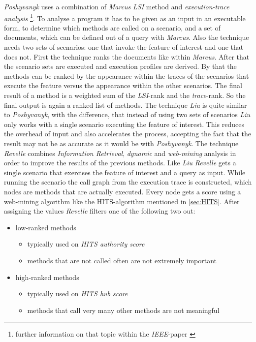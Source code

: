 \textit{Poshyvanyk} uses a combination of \textit{Marcus} \textit{LSI} method and \textit{execution-trace analysis} \footnote{further information on that topic within the \textit{IEEE}-paper \cite{antoniol2006feature}}. To analyse a program it has to be given as an input in an executable form, to determine which methods are called on a scenario, and a set of documents, which can be defined out of a query with \textit{Marcus}. Also the technique needs two sets of scenarios: one that invoke the feature of interest and one that does not. First the technique ranks the documents like within \textit{Marcus}. After that the scenario sets are executed and execution profiles are derived. By that the methods can be ranked by the appearance within the traces of the scenarios that execute the feature versus the appearance within the other scenarios. The final result of a method is a weighted sum of the \textit{LSI}-rank and the \textit{trace}-rank. So the final output is again a ranked list of methods. \cite{poshyvanyk2007feature} \newline
The technique \textit{Liu} is quite similar to \textit{Poshyvanyk}, with the difference, that instead of using two sets of scenarios \textit{Liu} only works with a single scenario executing the feature of interest. This reduces the overhead of input and also accelerates the process, accepting the fact that the result may not be as accurate as it would be with \textit{Poshyvanyk}. \cite{liu2007feature} \newline
The technique \textit{Revelle} combines \textit{Information Retrieval}, \textit{dynamic} and \textit{web-mining} analysis in order to improve the results of the previous methods. Like \textit{Liu} \textit{Revelle} gets a single scenario that exercises the feature of interest and a query as input. While running the scenario the call graph from the execution trace is constructed, which nodes are methods that are actually executed. Every node gets a score using a web-mining algorithm like the HITS-algorithm mentioned in \autoref{sec:HITS}. After assigning the values \textit{Revelle} filters one of the following two out:
\begin{itemize}
	\item low-ranked methods 
	\begin{itemize}
		\item typically used on \textit{HITS authority score}
		\item methods that are not called often are not extremely important
	\end{itemize}
	\item high-ranked methods 
	\begin{itemize}
		\item typically used on \textit{HITS hub score}
		\item  methods that call very many other methods are not meaningful
	\end{itemize}
\end{itemize} 
